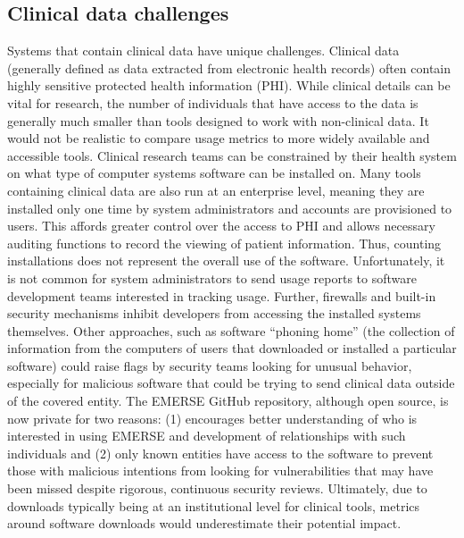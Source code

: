 \documentclass{article}
\begin{document}
\subsection{Clinical data challenges}

Systems that contain clinical data have unique challenges.  Clinical data (generally defined as data extracted from electronic health records) often contain highly sensitive protected health information (PHI). While clinical details can be vital for research, the number of individuals that have access to the data is generally much smaller than tools designed to work with non-clinical data. It would not be realistic to compare usage metrics to more widely available and accessible tools. Clinical research teams can be constrained by their health system on what type of computer systems software can be installed on. Many tools containing clinical data are also run at an enterprise level, meaning they are installed only one time by system administrators and accounts are provisioned to users. This affords greater control over the access to PHI and allows necessary auditing functions to record the viewing of patient information.  Thus, counting installations does not represent the overall use of the software. Unfortunately, it is not common for system administrators to send usage reports to software development teams interested in tracking usage.  Further, firewalls and built-in security mechanisms inhibit developers from accessing the installed systems themselves. Other approaches, such as software “phoning home” (the collection of information from the computers of users that downloaded or installed a particular software) could raise flags by security teams looking for unusual behavior, especially for malicious software that could be trying to send clinical data outside of the covered entity. The EMERSE \cite{hanauer_supporting_2015} GitHub repository, although open source, is now private for two reasons: (1) encourages  better understanding of who is interested in using EMERSE and development of relationships with such individuals and (2)  only known entities have access to the software to prevent those with malicious intentions from looking for vulnerabilities that may have been missed despite rigorous, continuous security reviews.  Ultimately, due to downloads typically being at an institutional level for clinical tools, metrics around software downloads would underestimate their potential impact.  
\end{document}
